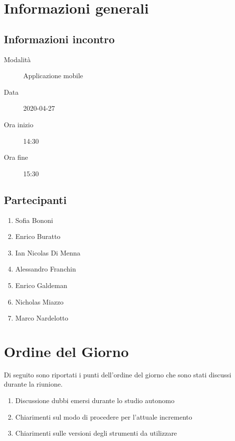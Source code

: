 \documentclass{article}
\begin{document}


\section{Informazioni generali}%
\label{sec:informazioni_generali}

\subsection{Informazioni incontro}%
\label{sub:informazioni_incontro}

\begin{description}
  \item[Modalità] Applicazione mobile 
  \item[Data] 2020-04-27
  \item[Ora inizio] 14:30
  \item[Ora fine] 15:30
\end{description}

\subsection{Partecipanti}%
\label{sub:partecipanti}

\begin{enumerate}
  \item Sofia Bononi
  \item Enrico Buratto
  \item Ian Nicolas Di Menna
  \item Alessandro Franchin
  \item Enrico Galdeman
  \item Nicholas Miazzo
  \item Marco Nardelotto
\end{enumerate}

\section{Ordine del Giorno}%
\label{ordine_del_giorno}
Di seguito sono riportati i punti dell'ordine del giorno che sono stati discussi durante la riunione.
\begin{enumerate}
  \item Discussione dubbi emersi durante lo studio autonomo
  \item Chiarimenti sul modo di procedere per l'attuale incremento
  \item Chiarimenti sulle versioni degli strumenti da utilizzare
\end{enumerate}
\end{document}
